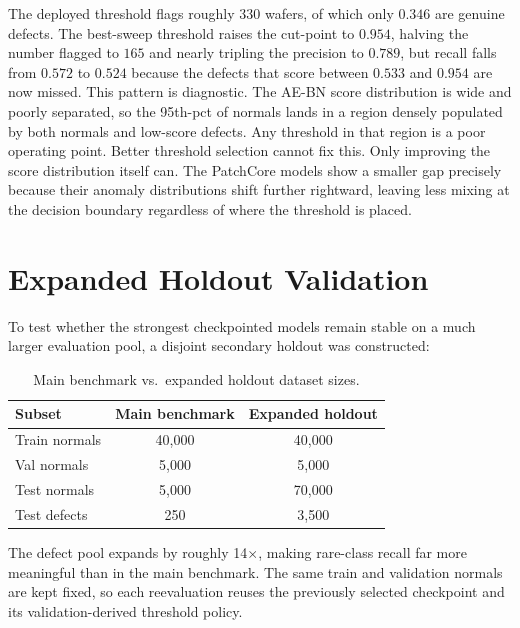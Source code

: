 \documentclass[11pt]{article}
\begin{document}
The deployed threshold flags roughly $330$ wafers, of which only $0.346$ are genuine defects.
The best-sweep threshold raises the cut-point to $0.954$, halving the number flagged to $165$
and nearly tripling the precision to $0.789$, but recall falls from $0.572$ to $0.524$ because
the defects that score between $0.533$ and $0.954$ are now missed.
This pattern is diagnostic. The AE-BN score distribution is wide and poorly separated, so the
95th-pct of normals lands in a region densely populated by both normals and low-score defects.
Any threshold in that region is a poor operating point.
Better threshold selection cannot fix this. Only improving the score distribution itself can.
The PatchCore models show a smaller gap precisely because their anomaly distributions shift further
rightward, leaving less mixing at the decision boundary regardless of where the threshold is placed.

\section{Expanded Holdout Validation}
\label{sec:holdout}

To test whether the strongest checkpointed models remain stable on a much larger
evaluation pool, a disjoint secondary holdout was constructed:

\begin{table}[H]
\centering
\caption{Main benchmark vs.\ expanded holdout dataset sizes.}
\label{tab:holdout_sizes}
\begin{tabular}{lcc}
\toprule
Subset & Main benchmark & Expanded holdout \\
\midrule
Train normals & 40{,}000 & 40{,}000 \\
Val normals   &  5{,}000 &  5{,}000 \\
Test normals  &  5{,}000 & 70{,}000 \\
Test defects  &    250   &  3{,}500 \\
\bottomrule
\end{tabular}
\end{table}

The defect pool expands by roughly 14$\times$, making rare-class recall far more
meaningful than in the main benchmark. The same train and validation normals are
kept fixed, so each reevaluation reuses the previously selected checkpoint and
its validation-derived threshold policy.
\end{document}
